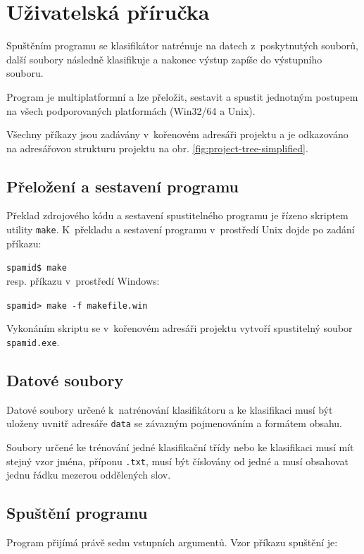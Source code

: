 \documentclass[a4paper, 12pt]{report}
\begin{document}
\chapter{Uživatelská příručka}

Spuštěním programu se klasifikátor natrénuje na datech z~poskytnutých 
souborů, další soubory následně klasifikuje a nakonec výstup zapíše do 
výstupního souboru.

Program je multiplatformní a lze přeložit, sestavit a spustit jednotným 
postupem na všech podporovaných platformách (Win32/64 a Unix).

Všechny příkazy jsou zadávány v~kořenovém adresáři projektu a je 
odkazováno na adresářovou strukturu projektu na obr. 
\ref{fig:project-tree-simplified}.

\section{Přeložení a sestavení programu}

Překlad zdrojového kódu a sestavení spustitelného programu je řízeno 
skriptem utility \texttt{make}. K~překladu a sestavení programu
v~prostředí Unix dojde po zadání příkazu:

\texttt{spamid\$ make}\\
resp. příkazu v~prostředí Windows:

\texttt{spamid> make -f makefile.win}

Vykonáním skriptu se v~kořenovém adresáři projektu vytvoří spustitelný 
soubor \texttt{spamid.exe}.

\section{Datové soubory}

Datové soubory určené k~natrénování klasifikátoru a ke klasifikaci musí 
být uloženy uvnitř adresáře \texttt{data} se závazným pojmenováním a 
formátem obsahu.

Soubory určené ke trénování jedné klasifikační třídy nebo ke klasifikaci 
musí mít stejný vzor jména, příponu \texttt{.txt}, musí být číslovány od 
jedné a musí obsahovat jednu řádku mezerou oddělených slov.

\section{Spuštění programu}

Program přijímá právě sedm vstupních argumentů. Vzor příkazu spuštění je:
\end{document}

